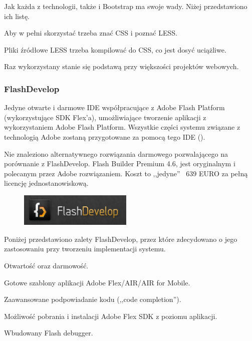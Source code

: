 Jak każda z technologii, także i Bootstrap ma swoje wady. Niżej przedstawiono ich listę.
\begin{packed_item}
    \item{Aby w pełni skorzystać trzeba znać CSS i poznać LESS.}
    \item{Pliki źródłowe LESS trzeba kompilować do CSS, co jest dosyć uciążliwe.}
    \item{Raz wykorzystany stanie się podstawą przy większości projektów webowych.}
\end{packed_item}

\newpage
\subsubsection{FlashDevelop}
Jedyne otwarte i darmowe IDE współpracujące z Adobe Flash Platform (wykorzystujące SDK Flex'a), umożliwiające tworzenie aplikacji z wykorzystaniem Adobe Flash Platform. Wszystkie części systemu związane z technologią Adobe zostaną przygotowane za pomocą tego IDE (\cite{flashDevelop}).

Nie znaleziono alternatywnego rozwiązania darmowego pozwalającego na porównanie z FlashDevelop. Flash Builder Premium 4.6, jest oryginalnym i polecanym przez Adobe rozwiązaniem. Koszt to ,,jedyne'' ~639 EURO za pełną licencję jednostanowiskową.

\begin{figure}
  \begin{center}
    \includegraphics[width=0.48\textwidth]{img/logos/flashdevelop.jpg}
  \end{center}
\end{figure}

Poniżej przedstawiono zalety FlashDevelop, przez które zdecydowano o jego zastosowaniu przy tworzeniu implementacji systemu.
\begin{packed_item}
    \item{Otwartość oraz darmowość.}
    \item{Gotowe szablony aplikacji Adobe Flex/AIR/AIR for Mobile.}
    \item{Zaawansowane podpowiadanie kodu (,,code completion'').}
    \item{Możliwość pobrania i instalacji  Adobe Flex SDK z poziomu aplikacji.}
    \item{Wbudowany Flash debugger.}
\end{packed_item}

